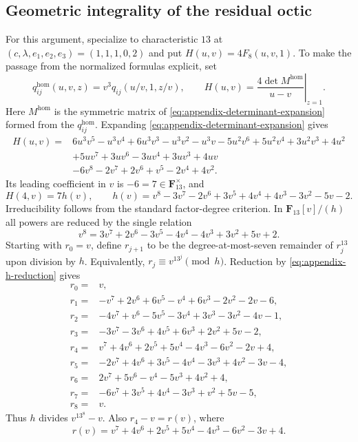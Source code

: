 \documentclass[10pt]{amsart}
\numberwithin{equation}{section}
\theoremstyle{definition}
\theoremstyle{remark}
\begin{document}
\subsection{Geometric integrality of the residual octic}
\label{app:residual-octic-certificate}
For this argument, specialize to characteristic $13$ at
$(c,\lambda,e_1,e_2,e_3)=(1,1,1,0,2)$ and put
$H(u,v)=4F_8(u,v,1)$.  To make the passage from the normalized formulas
explicit, set
\[
 q_{ij}^{\mathrm{hom}}(u,v,z)
   =v^3q_{ij}(u/v,1,z/v),\qquad
 H(u,v)=
 \left.\frac{4\det M^{\mathrm{hom}}}{u-v}\right|_{z=1}.
\]
Here $M^{\mathrm{hom}}$ is the symmetric matrix of
\eqref{eq:appendix-determinant-expansion} formed from the
$q_{ij}^{\mathrm{hom}}$.  Expanding
\eqref{eq:appendix-determinant-expansion} gives
\begin{align*}
H(u,v)={}&6u^3v^5-u^3v^4+6u^3v^3-u^3v^2-u^3v
 -5u^2v^6+5u^2v^4+3u^2v^3+4u^2\\
&+5uv^7+3uv^6-3uv^4+3uv^3+4uv\\
&-6v^8-2v^7+2v^6+v^5-2v^4+4v^2.
\end{align*}
Its leading coefficient in $v$ is $-6=7\in\mathbf F_{13}^\times$, and
\[
 H(4,v)=7h(v),
 \qquad
 h(v)=v^8-3v^7-2v^6+3v^5+4v^4+4v^3-3v^2-5v-2.
\]
Irreducibility follows from the standard factor-degree criterion.  In
$\mathbf F_{13}[v]/(h)$ all powers are reduced by the single relation
\begin{equation}
 v^8=3v^7+2v^6-3v^5-4v^4-4v^3+3v^2+5v+2.
\label{eq:appendix-h-reduction}
\end{equation}
Starting with $r_0=v$, define $r_{j+1}$ to be the degree-at-most-seven
remainder of $r_j^{13}$ upon division by $h$.  Equivalently,
$r_j\equiv v^{13^j}\pmod h$.  Reduction by
\eqref{eq:appendix-h-reduction} gives
\begin{align*}
r_0={}&v,\\
r_1={}&-v^7+2v^6+6v^5-v^4+6v^3-2v^2-2v-6,\\
r_2={}&-4v^7+v^6-5v^5-3v^4+3v^3-3v^2-4v-1,\\
r_3={}&-3v^7-3v^6+4v^5+6v^3+2v^2+5v-2,\\
r_4={}&v^7+4v^6+2v^5+5v^4-4v^3-6v^2-2v+4,\\
r_5={}&-2v^7+4v^6+3v^5-4v^4-3v^3+4v^2-3v-4,\\
r_6={}&2v^7+5v^6-v^4-5v^3+4v^2+4,\\
r_7={}&-6v^7+3v^5+4v^4-3v^3+v^2+5v-5,\\
r_8={}&v.
\end{align*}
Thus $h$ divides $v^{13^8}-v$.  Also $r_4-v=r(v)$, where
\[
 r(v)=v^7+4v^6+2v^5+5v^4-4v^3-6v^2-3v+4.
\]
\end{document}
